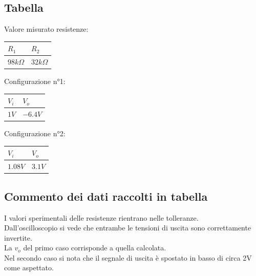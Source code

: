 \documentclass[12pt]{article}
\begin{document}
\subsection{Tabella}
Valore misurato resistenze:\\
\begin{center}
        \begin{tabular}{|p{2cm}|p{2cm}|}
            \hline
            \rowcolor{RoyalBlue} $R_1$ & $R_2$ \\
            \hline
            \rowcolor{CornflowerBlue} $98k\Omega$ & $32k\Omega$  \\ 
            \hline
        \end{tabular}
        \label{Valore resistenze}
\end{center}
\noindent
Configurazione n°1:\\
\begin{center}
    \begin{tabular}{|p{2cm} |p{2cm}|}
        \hline
        \rowcolor{RoyalBlue} $V_i$ & $V_o$  \\
        \hline
        \rowcolor{CornflowerBlue} $1V$ & $-6.4V$  \\ 
        \hline
    \end{tabular}
\end{center}


\noindent Configurazione n°2:\\
\begin{center}
    \begin{tabular}{|p{2cm} |p{2cm}|}
        \hline
        \rowcolor{RoyalBlue} $V_i$ & $V_o$  \\
        \hline
        \rowcolor{CornflowerBlue} $1.08V$ & $3.1V$  \\ 
        \hline
    \end{tabular}
\end{center}
\subsection{Commento dei dati raccolti in tabella}
I valori sperimentali delle resistenze rientrano nelle tolleranze.\\
Dall'oscilloscopio si vede che entrambe le tensioni di uscita sono correttamente invertite.\\
La $v_o$ del primo caso corrisponde a quella calcolata.\\
Nel secondo caso si nota che il segnale di uscita è spostato in basso di circa 2V come aspettato.\\
\end{document}
